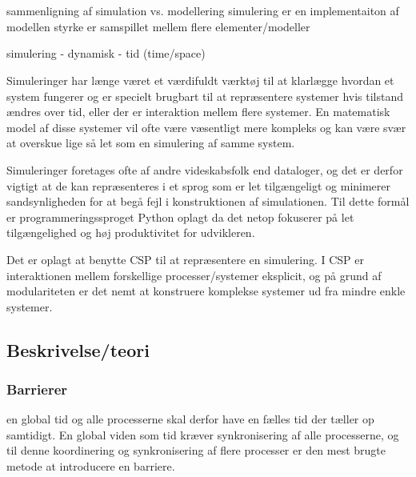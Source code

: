 \chapter{\Des}
sammenligning af simulation vs. modellering
  simulering er en implementaiton af modellen
  styrke er samspillet mellem flere elementer/modeller


simulering - dynamisk - tid (time/space)

Simuleringer har længe været et værdifuldt værktøj til at klarlægge hvordan et 
system fungerer og er specielt brugbart til at repræsentere systemer hvis 
tilstand ændres over tid, eller der er interaktion mellem flere systemer. En 
matematisk model af disse systemer vil ofte være væsentligt mere kompleks og 
kan være svær at overskue lige så let som en simulering af samme system. 

Simuleringer foretages ofte af andre videskabsfolk end dataloger, og det er 
derfor vigtigt at de kan repræsenteres i et sprog som er let tilgængeligt og 
minimerer sandsynligheden for at begå fejl i konstruktionen af simulationen.  
Til dette formål er programmeringssproget Python oplagt da det netop fokuserer 
på let tilgængelighed og høj produktivitet for udvikleren. 

Det er oplagt at benytte CSP\cite{hoare-csp} til at repræsentere en simulering.  
I CSP er interaktionen mellem forskellige processer/systemer eksplicit, og på 
grund af modulariteten er det nemt at konstruere komplekse systemer ud fra 
mindre enkle systemer. 

\section{Beskrivelse/teori} \label{sec:des-teori}
\subsection{Barrierer} \label{sec:barrierer}
   en 
global tid og alle processerne skal derfor have en fælles tid der tæller op 
samtidigt.  En global viden som tid kræver synkronisering af alle 
processerne, og til denne koordinering og synkronisering af flere 
processer er den mest brugte metode at introducere en barriere.

